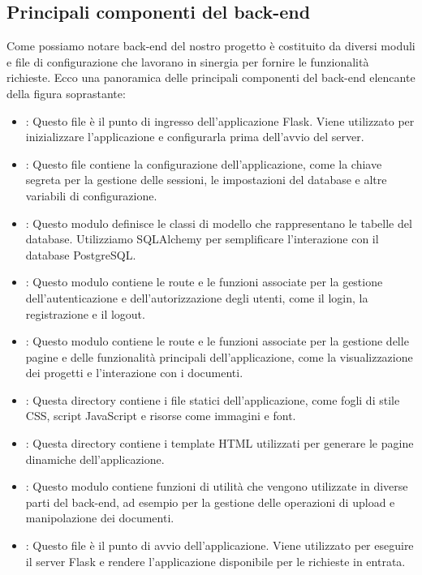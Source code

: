 \documentclass{report}
\begin{document}
\subsection{Principali componenti del back-end}
Come possiamo notare back-end del nostro progetto è costituito da diversi moduli e file di configurazione che lavorano in sinergia per fornire le funzionalità richieste. Ecco una panoramica delle principali componenti del back-end elencante della figura soprastante:
\begin{itemize}
\item {}: Questo file è il punto di ingresso dell'applicazione Flask. Viene utilizzato per inizializzare l'applicazione e configurarla prima dell'avvio del server.

\item {}: Questo file contiene la configurazione dell'applicazione, come la chiave segreta per la gestione delle sessioni, le impostazioni del database e altre variabili di configurazione.

\item {}: Questo modulo definisce le classi di modello che rappresentano le tabelle del database. Utilizziamo SQLAlchemy per semplificare l'interazione con il database PostgreSQL.

\item {}: Questo modulo contiene le route e le funzioni associate per la gestione dell'autenticazione e dell'autorizzazione degli utenti, come il login, la registrazione e il logout.

\item {}: Questo modulo contiene le route e le funzioni associate per la gestione delle pagine e delle funzionalità principali dell'applicazione, come la visualizzazione dei progetti e l'interazione con i documenti.

\item {}: Questa directory contiene i file statici dell'applicazione, come fogli di stile CSS, script JavaScript e risorse come immagini e font.

\item {}: Questa directory contiene i template HTML utilizzati per generare le pagine dinamiche dell'applicazione.

\item {}: Questo modulo contiene funzioni di utilità che vengono utilizzate in diverse parti del back-end, ad esempio per la gestione delle operazioni di upload e manipolazione dei documenti.

\item {}: Questo file è il punto di avvio dell'applicazione. Viene utilizzato per eseguire il server Flask e rendere l'applicazione disponibile per le richieste in entrata.
\end{itemize}
\end{document}
